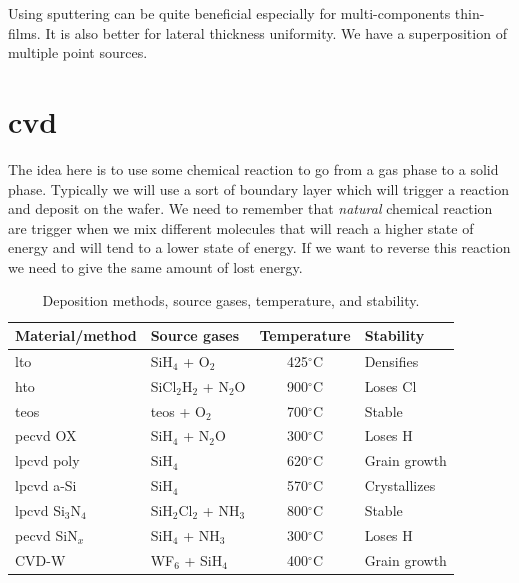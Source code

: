 \documentclass{report}
\begin{document}
Using sputtering can be quite beneficial especially for multi-components thin-films. It is also better for lateral thickness uniformity. We have a superposition of multiple point sources.

\section{\gls{cvd}}

The idea here is to use some chemical reaction to go from a gas phase to a solid phase. Typically we will use a sort of boundary layer which will trigger a reaction and deposit on the wafer. We need to remember that \textit{natural} chemical reaction are trigger when we mix different molecules that will reach a higher state of energy and will tend to a lower state of energy. If we want to reverse this reaction we need to give the same amount of lost energy.

\begin{table}[hbt]
    \centering
    \begin{tabular}{|l|l|c|l|}
        \hline
        \textbf{Material/method} & \textbf{Source gases} & \textbf{Temperature} & \textbf{Stability} \\ 
        \hline
        \gls{lto}          & SiH$_4$ + O$_2$       & 425$^\circ$C  & Densifies \\ 
        \gls{hto}          & SiCl$_2$H$_2$ + N$_2$O & 900$^\circ$C  & Loses Cl \\ 
        \gls{teos}         & \gls{teos} + O$_2$         & 700$^\circ$C  & Stable \\ 
        \gls{pecvd} OX     & SiH$_4$ + N$_2$O     & 300$^\circ$C  & Loses H \\ 
        \gls{lpcvd} poly   & SiH$_4$              & 620$^\circ$C  & Grain growth \\ 
        \gls{lpcvd} a-Si   & SiH$_4$              & 570$^\circ$C  & Crystallizes \\ 
        \gls{lpcvd} Si$_3$N$_4$ & SiH$_2$Cl$_2$ + NH$_3$ & 800$^\circ$C  & Stable \\ 
        \gls{pecvd} SiN$_x$ & SiH$_4$ + NH$_3$     & 300$^\circ$C  & Loses H \\ 
        CVD-W        & WF$_6$ + SiH$_4$     & 400$^\circ$C  & Grain growth \\ 
        \hline
    \end{tabular}
    \caption{Deposition methods, source gases, temperature, and stability.}
    \label{tab:deposition_methods}
\end{table}
\end{document}
